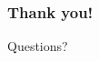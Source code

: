 \documentclass{beamer}
\begin{document}


\begin{frame}
   \frametitle{Thank you!}
   Questions?
 \end{frame}


\end{document}
